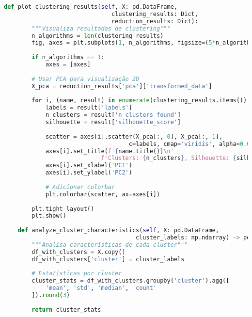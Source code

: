\begin{pythonbox}
\begin{lstlisting}[language=Python]      
    def plot_clustering_results(self, X: pd.DataFrame, 
                               clustering_results: Dict,
                               reduction_results: Dict):
        """Visualiza resultados de clustering"""
        n_algorithms = len(clustering_results)
        fig, axes = plt.subplots(1, n_algorithms, figsize=(5*n_algorithms, 4))
        
        if n_algorithms == 1:
            axes = [axes]
        
        # Usar PCA para visualização 2D
        X_pca = reduction_results['pca']['transformed_data']
        
        for i, (name, result) in enumerate(clustering_results.items()):
            labels = result['labels']
            n_clusters = result['n_clusters_found']
            silhouette = result['silhouette_score']
            
            scatter = axes[i].scatter(X_pca[:, 0], X_pca[:, 1], 
                                    c=labels, cmap='viridis', alpha=0.6)
            axes[i].set_title(f'{name.title()}\n'
                            f'Clusters: {n_clusters}, Silhouette: {silhouette:.3f}')
            axes[i].set_xlabel('PC1')
            axes[i].set_ylabel('PC2')
            
            # Adicionar colorbar
            plt.colorbar(scatter, ax=axes[i])
        
        plt.tight_layout()
        plt.show()
    
    def analyze_cluster_characteristics(self, X: pd.DataFrame, 
                                      cluster_labels: np.ndarray) -> pd.DataFrame:
        """Analisa características de cada cluster"""
        df_with_clusters = X.copy()
        df_with_clusters['cluster'] = cluster_labels
        
        # Estatísticas por cluster
        cluster_stats = df_with_clusters.groupby('cluster').agg([
            'mean', 'std', 'median', 'count'
        ]).round(3)
        
        return cluster_stats
\end{lstlisting}
\end{pythonbox}
